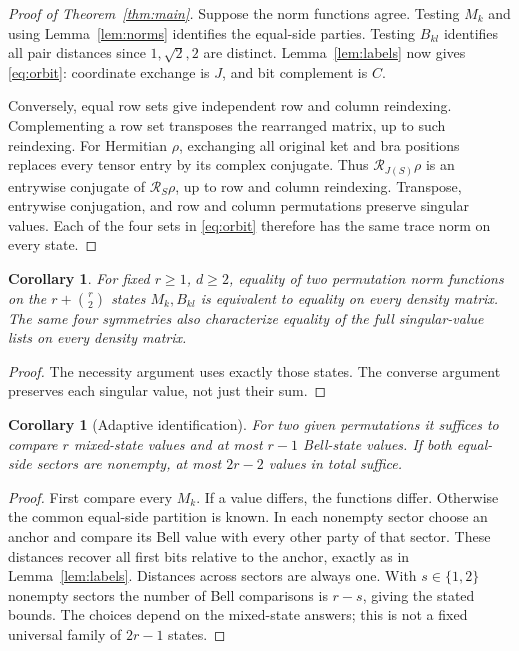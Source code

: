 \documentclass[11pt]{article}
\newtheorem{corollary}[theorem]{Corollary}
\newcommand{\R}{\mathcal R}
\begin{document}
\begin{proof}[Proof of Theorem~\ref{thm:main}]
Suppose the norm functions agree. Testing $M_k$ and using
Lemma~\ref{lem:norms} identifies the equal-side parties. Testing $B_{kl}$
identifies all pair distances since $1,\sqrt2,2$ are distinct.
Lemma~\ref{lem:labels} now gives \eqref{eq:orbit}: coordinate exchange
is $J$, and bit complement is $C$.

Conversely, equal row sets give independent row and column reindexing.
Complementing a row set transposes the rearranged matrix, up to such
reindexing. For Hermitian $\rho$, exchanging all original ket and bra
positions replaces every tensor entry by its complex conjugate. Thus
$\R_{J(S)}\rho$ is an entrywise conjugate of $\R_S\rho$, up to row and
column reindexing. Transpose, entrywise conjugation, and row and column
permutations preserve singular values. Each of the four sets in
\eqref{eq:orbit} therefore has the same trace norm on every state.
\end{proof}

\begin{corollary}\label{cor:finite}
For fixed $r\geq1$, $d\geq2$, equality of two permutation norm functions
on the $r+\binom r2$ states $M_k,B_{kl}$ is equivalent to equality on
every density matrix. The same four symmetries also characterize
equality of the full singular-value lists on every density matrix.
\end{corollary}
\begin{proof}
The necessity argument uses exactly those states. The converse argument
preserves each singular value, not just their sum.
\end{proof}

\begin{corollary}[Adaptive identification]\label{cor:adaptive}
For two given permutations it suffices to compare $r$ mixed-state
values and at most $r-1$ Bell-state values. If both equal-side sectors
are nonempty, at most $2r-2$ values in total suffice.
\end{corollary}
\begin{proof}
First compare every $M_k$. If a value differs, the functions differ.
Otherwise the common equal-side partition is known. In each nonempty
sector choose an anchor and compare its Bell value with every other
party of that sector. These distances recover all first bits relative
to the anchor, exactly as in Lemma~\ref{lem:labels}. Distances across
sectors are always one. With $s\in\{1,2\}$ nonempty sectors the number
of Bell comparisons is $r-s$, giving the stated bounds. The choices
depend on the mixed-state answers; this is not a fixed universal
family of $2r-1$ states.
\end{proof}
\end{document}
